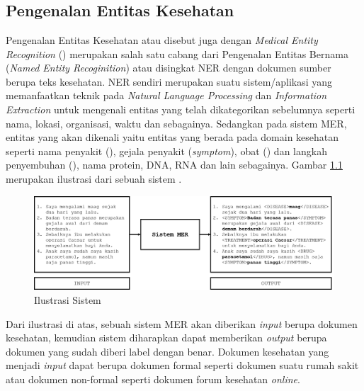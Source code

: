 \chapter{\babDua}

\section{Pengenalan Entitas Kesehatan}\label{aboutmer}
Pengenalan Entitas Kesehatan atau disebut juga dengan \textit{Medical Entity Recognition} (\mer) merupakan salah satu cabang dari Pengenalan Entitas Bernama (\textit{Named Entity Recoginition}) atau disingkat NER dengan dokumen sumber berupa teks kesehatan. NER sendiri merupakan suatu sistem/aplikasi yang memanfaatkan teknik pada \textit{Natural Language Processing} dan \textit{Information Extraction} untuk mengenali entitas yang telah dikategorikan sebelumnya seperti nama, lokasi, organisasi, waktu dan sebagainya. Sedangkan pada sistem MER, entitas yang akan dikenali yaitu entitas yang berada pada domain kesehatan seperti nama penyakit (\textit{\disease}), gejala penyakit (\textit{symptom}), obat (\textit{\drug}) dan langkah penyembuhan (\textit{\treatment}), nama protein, DNA, RNA dan lain sebagainya. Gambar \ref{fig:mer_ilustration} merupakan ilustrasi dari sebuah sistem \mer.

\begin{figure}
	\centering
	\includegraphics[width=1.0\linewidth]{images/mer_ilustration}
	\caption{Ilustrasi Sistem \mer}
	\label{fig:mer_ilustration}
\end{figure}

Dari ilustrasi di atas, sebuah sistem MER akan diberikan \textit{input} berupa dokumen kesehatan, kemudian sistem diharapkan dapat memberikan \textit{output} berupa dokumen yang sudah diberi label dengan benar. Dokumen kesehatan yang menjadi \textit{input} dapat berupa dokumen formal seperti dokumen suatu rumah sakit atau dokumen non-formal seperti dokumen forum kesehatan \textit{online}.

